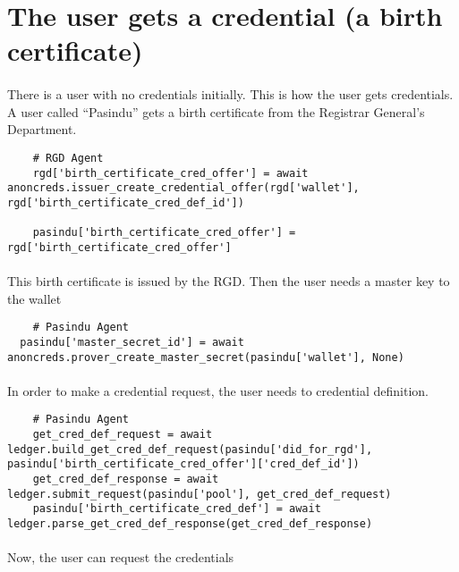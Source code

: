 \section{The user gets a credential (a birth certificate)}

\paragraph{}
There is a user with no credentials initially. This is how the user gets credentials. A user called “Pasindu” gets a birth certificate from the Registrar General’s Department.

\begin{verbatim}
    # RGD Agent
    rgd['birth_certificate_cred_offer'] = await anoncreds.issuer_create_credential_offer(rgd['wallet'], rgd['birth_certificate_cred_def_id'])
    
    pasindu['birth_certificate_cred_offer'] = rgd['birth_certificate_cred_offer']
\end{verbatim}

\paragraph{}
This birth certificate is issued by the RGD.
Then the user needs a master key to the wallet

\begin{verbatim}
    # Pasindu Agent
  pasindu['master_secret_id'] = await anoncreds.prover_create_master_secret(pasindu['wallet'], None)
\end{verbatim}

\paragraph{}
In order to make a credential request, the user needs to credential definition.

\begin{verbatim}
    # Pasindu Agent
    get_cred_def_request = await ledger.build_get_cred_def_request(pasindu['did_for_rgd'], pasindu['birth_certificate_cred_offer']['cred_def_id'])
    get_cred_def_response = await ledger.submit_request(pasindu['pool'], get_cred_def_request)
    pasindu['birth_certificate_cred_def'] = await ledger.parse_get_cred_def_response(get_cred_def_response)
\end{verbatim}

\paragraph{}
Now, the user can request the credentials

